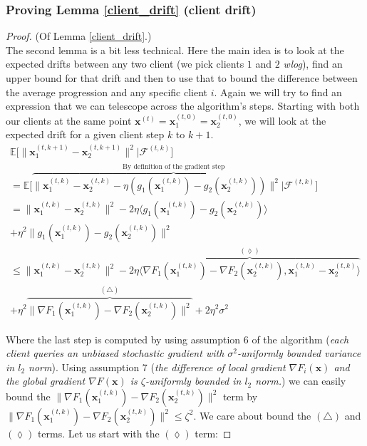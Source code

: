 \subsubsection*{Proving Lemma \ref{client_drift} (client drift)}
\begin{proof}  (Of Lemma \ref{client_drift}.)\\
    The second lemma is a bit less technical. Here the main idea is to look at the expected drifts between any two client (we pick clients $1$ and $2$ \textit{wlog}), find an upper bound for that drift and then to use that to bound the difference between the average progression and any specific client $i$. Again we will try to find an expression that we can telescope across the algorithm's steps. Starting with both our clients at the same point $\bm{x}^{(t)} = \bm{x}_1^{(t,0)} = \bm{x}_2^{(t,0)}$, we will look at the expected drift for a given client step $k$ to $k+1$.
    \begin{align*}
        \mathbb{E} \bigg[ \| \bm{x}_1^{(t,k+1)} - \bm{x}_2^{(t,k+1)} \|^2 | \mathcal{F}^{(t,k)} \bigg] \\ 
        = \mathbb{E} \bigg[ \overbrace{ \| \bm{x}_1^{(t,k)} - \bm{x}_2^{(t,k)} - \eta \left( g_1(\bm{x}_1^{(t,k)}) - g_2(\bm{x}_2^{(t,k)}) \right) \|^2 | \mathcal{F}^{(t,k)} }^\text{By definition of the gradient step} \bigg] \\
        = \| \bm{x}_1^{(t,k)} - \bm{x}_2^{(t,k)} \|^2 - 2 \eta \langle g_1 ( \bm{x}_1^{(t,k)}) - g_2 ( \bm{x}_2^{(t,k)})  \rangle \\
        + \eta^2 \|  g_1 ( \bm{x}_1^{(t,k)}) -g_2 ( \bm{x}_2^{(t,k)})  \|^2  \\
        \leq \| \bm{x}_1^{(t,k)} - \bm{x}_2^{(t,k)} \|^2 - 2 \eta \overbrace{\langle \nabla F_1 ( \bm{x}_1^{(t,k)}) -\nabla F_2 ( \bm{x}_2^{(t,k)}) ,\bm{x}_1^{(t,k)} - \bm{x}_2^{(t,k)} \rangle}^{(\lozenge)} \\
        + \eta^2 \overbrace{\|  \nabla F_1 ( \bm{x}_1^{(t,k)}) -\nabla F_2 ( \bm{x}_2^{(t,k)})  \|^2}^{(\triangle)} + 2 \eta^2 \sigma^2
    \end{align*}

    Where the last step is computed by using assumption 6 of the algorithm (\textit{each client queries an unbiased stochastic gradient with $\sigma^2$-uniformly bounded variance in $l_2$ norm}). Using assumption 7 (\textit{the difference of local gradient $\nabla F_i(\bm{x})$ and the global gradient $\nabla F(\bm{x})$ is $\zeta$-uniformly bounded in $l_2$ norm.}) we can easily bound the $\|  \nabla F_1 ( \bm{x}_1^{(t,k)}) -\nabla F_2 ( \bm{x}_2^{(t,k)})  \|^2$ term by  $\|  \nabla F_1 ( \bm{x}_1^{(t,k)}) -\nabla F_2 ( \bm{x}_2^{(t,k)})  \|^2 \leq \zeta^2$. We care about bound the $(\triangle)$ and $(\lozenge)$ terms. Let us start with the $(\lozenge)$ term:


\end{proof}
